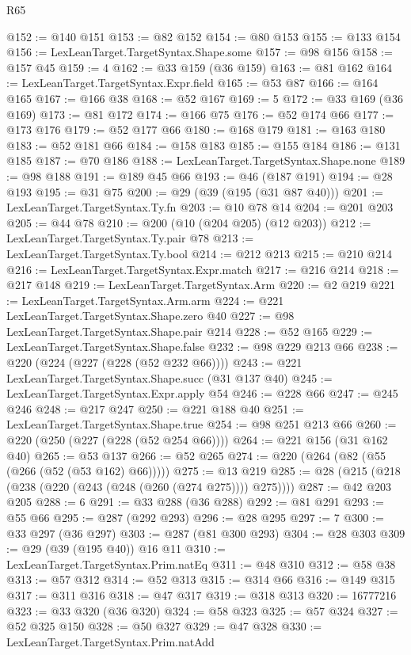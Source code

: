 \begin{lexlean}{R65}
\begin{coremodule}
@152 := @140 @151
@153 := @82 @152
@154 := @80 @153
@155 := @133 @154
@156 := LexLeanTarget.TargetSyntax.Shape.some
@157 := @98 @156
@158 := @157 @45
@159 := 4
@162 := @33 @159 (@36 @159)
@163 := @81 @162
@164 := LexLeanTarget.TargetSyntax.Expr.field
@165 := @53 @87
@166 := @164 @165
@167 := @166 @38
@168 := @52 @167
@169 := 5
@172 := @33 @169 (@36 @169)
@173 := @81 @172
@174 := @166 @75
@176 := @52 @174 @66
@177 := @173 @176
@179 := @52 @177 @66
@180 := @168 @179
@181 := @163 @180
@183 := @52 @181 @66
@184 := @158 @183
@185 := @155 @184
@186 := @131 @185
@187 := @70 @186
@188 := LexLeanTarget.TargetSyntax.Shape.none
@189 := @98 @188
@191 := @189 @45 @66
@193 := @46 (@187 @191)
@194 := @28 @193
@195 := @31 @75
@200 := @29 (@39 (@195 (@31 @87 @40)))
@201 := LexLeanTarget.TargetSyntax.Ty.fn
@203 := @10 @78 @14
@204 := @201 @203
@205 := @44 @78
@210 := @200 (@10 (@204 @205) (@12 @203))
@212 := LexLeanTarget.TargetSyntax.Ty.pair @78
@213 := LexLeanTarget.TargetSyntax.Ty.bool
@214 := @212 @213
@215 := @210 @214
@216 := LexLeanTarget.TargetSyntax.Expr.match
@217 := @216 @214
@218 := @217 @148
@219 := LexLeanTarget.TargetSyntax.Arm
@220 := @2 @219
@221 := LexLeanTarget.TargetSyntax.Arm.arm
@224 := @221 LexLeanTarget.TargetSyntax.Shape.zero @40
@227 := @98 LexLeanTarget.TargetSyntax.Shape.pair @214
@228 := @52 @165
@229 := LexLeanTarget.TargetSyntax.Shape.false
@232 := @98 @229 @213 @66
@238 := @220 (@224 (@227 (@228 (@52 @232 @66))))
@243 := @221 LexLeanTarget.TargetSyntax.Shape.succ (@31 @137 @40)
@245 := LexLeanTarget.TargetSyntax.Expr.apply @54
@246 := @228 @66
@247 := @245 @246
@248 := @217 @247
@250 := @221 @188 @40
@251 := LexLeanTarget.TargetSyntax.Shape.true
@254 := @98 @251 @213 @66
@260 := @220 (@250 (@227 (@228 (@52 @254 @66))))
@264 := @221 @156 (@31 @162 @40)
@265 := @53 @137
@266 := @52 @265
@274 := @220 (@264 (@82 (@55 (@266 (@52 (@53 @162) @66)))))
@275 := @13 @219
@285 := @28 (@215 (@218 (@238 (@220 (@243 (@248 (@260 (@274 @275)))) @275))))
@287 := @42 @203 @205
@288 := 6
@291 := @33 @288 (@36 @288)
@292 := @81 @291
@293 := @55 @66
@295 := @287 (@292 @293)
@296 := @28 @295
@297 := 7
@300 := @33 @297 (@36 @297)
@303 := @287 (@81 @300 @293)
@304 := @28 @303
@309 := @29 (@39 (@195 @40)) @16 @11
@310 := LexLeanTarget.TargetSyntax.Prim.natEq
@311 := @48 @310
@312 := @58 @38
@313 := @57 @312
@314 := @52 @313
@315 := @314 @66
@316 := @149 @315
@317 := @311 @316
@318 := @47 @317
@319 := @318 @313
@320 := 16777216
@323 := @33 @320 (@36 @320)
@324 := @58 @323
@325 := @57 @324
@327 := @52 @325 @150
@328 := @50 @327
@329 := @47 @328
@330 := LexLeanTarget.TargetSyntax.Prim.natAdd

\end{coremodule}
\end{lexlean}
